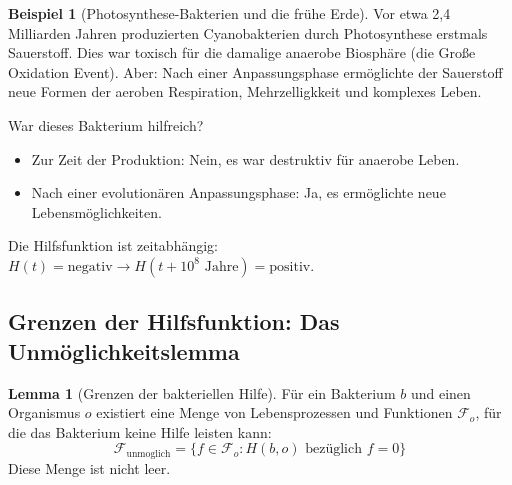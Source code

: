 \documentclass[a4paper,12pt]{article}
\theoremstyle{definition}
\newtheorem{beispiel}{Beispiel}
\newtheorem{lemma}{Lemma}
\begin{document}
\begin{beispiel}[Photosynthese-Bakterien und die frühe Erde]
Vor etwa 2,4 Milliarden Jahren produzierten Cyanobakterien durch Photosynthese erstmals Sauerstoff. Dies war toxisch für die damalige anaerobe Biosphäre (die Große Oxidation Event). Aber: Nach einer Anpassungsphase ermöglichte der Sauerstoff neue Formen der aeroben Respiration, Mehrzelligkkeit und komplexes Leben.

War dieses Bakterium hilfreich? 
\begin{itemize}
    \item[-] Zur Zeit der Produktion: Nein, es war destruktiv für anaerobe Leben.
    \item[-] Nach einer evolutionären Anpassungsphase: Ja, es ermöglichte neue Lebensmöglichkeiten.
\end{itemize}
Die Hilfsfunktion ist zeitabhängig: $H(t) = \text{negativ} \to H(t + 10^8 \text{ Jahre}) = \text{positiv}$.
\end{beispiel}

\subsection{Grenzen der Hilfsfunktion: Das Unmöglichkeitslemma}

\begin{lemma}[Grenzen der bakteriellen Hilfe]
\label{lem:hilfsfunktion}
Für ein Bakterium $b$ und einen Organismus $o$ existiert eine Menge von Lebensprozessen und Funktionen $\mathcal{F}_o$, für die das Bakterium keine Hilfe leisten kann:
\[
\mathcal{F}_{\text{unmoglich}} = \{f \in \mathcal{F}_o : H(b, o) \text{ bezüglich } f = 0\}
\]
Diese Menge ist nicht leer.
\end{lemma}
\end{document}
